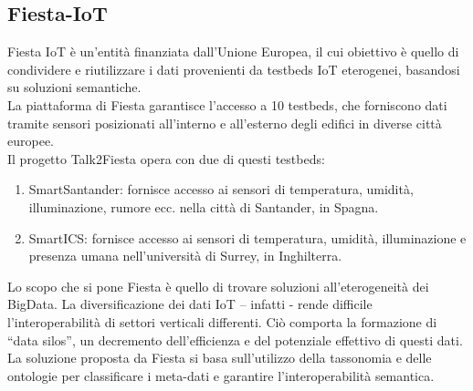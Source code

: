 \documentclass[a4paper,11pt]{article}
\theoremstyle{plain}
\begin{document}
\subsection*{Fiesta-IoT}
Fiesta IoT è un’entità finanziata dall’Unione Europea, il cui obiettivo è quello di condividere e riutilizzare i dati provenienti da testbeds IoT eterogenei, basandosi su soluzioni semantiche. \\ 
La piattaforma di Fiesta garantisce l’accesso a 10 testbeds, che forniscono dati tramite sensori posizionati all'interno e all'esterno degli edifici in diverse città europee.\\
Il progetto Talk2Fiesta opera con due di questi testbeds:
\begin{enumerate}
\item SmartSantander: fornisce accesso ai sensori di temperatura, umidità, illuminazione, rumore ecc. nella città di Santander, in Spagna.
\item SmartICS: fornisce accesso ai sensori di temperatura, umidità, illuminazione e presenza umana nell’università di Surrey, in Inghilterra.
\end{enumerate} 
Lo scopo che si pone Fiesta è quello di trovare soluzioni all'eterogeneità dei BigData. La diversificazione dei dati IoT – infatti - rende difficile l'interoperabilità di settori verticali differenti. Ciò comporta la formazione di “data silos”, un decremento dell'efficienza e del potenziale effettivo di questi dati.
La soluzione proposta da Fiesta si basa sull'utilizzo della tassonomia e delle ontologie per classificare i meta-dati e garantire l'interoperabilità semantica.
\end{document}
